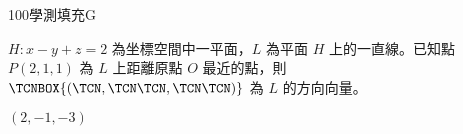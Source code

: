     \begin{QUESTION}
        \begin{ExamInfo}{100}{學測}{填充}{G}
        \end{ExamInfo}
        \begin{ExamAnsRateInfo}{31}{74}{17}{2}
        \end{ExamAnsRateInfo}
        \begin{QBODY}
            $H: x-y+z=2$ 為坐標空間中一平面，$L$ 為平面 $H$ 上的一直線。已知點 $P(2,1,1)$ 為 $L$ 上距離原點 $O$ 最近的點，則 $\TCNBOX{(\TCN,\TCN\TCN,\TCN\TCN)}$ 為 $L$ 的方向向量。
        \end{QBODY}
        \begin{QFROMS}
        \end{QFROMS}
        \begin{QTAGS}\end{QTAGS}
        \begin{QANS}
            $(2,-1,-3)$
        \end{QANS}
        \begin{QSOLLIST}
        \end{QSOLLIST}
        \begin{QEMPTYSPACE}
        \end{QEMPTYSPACE}
    \end{QUESTION}
